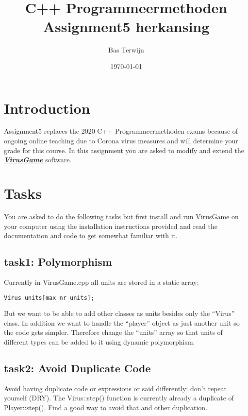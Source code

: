 \documentclass[12pt]{article}
\title{C++ Programmeermethoden Assignment5 herkansing}
\author{Bas Terwijn}
\date{\today}
\newcommand*{\link}[2]{\href{#1}{\color{blue}\textbf{\textit{#2}}}}
\begin{document}
\maketitle

\section{Introduction}
Assignment5 replaces the 2020 C++ Programmeermethoden exams because of
ongoing online teaching due to Corona virus measures and will
determine your grade for this course. In this assignment you are asked
to modify and extend the
\link{https://bitbucket.org/bterwijn/virusgame} { VirusGame }
software.
     
\section{Tasks}
You are asked to do the following tasks but first install and run
VirusGame on your computer using the installation instructions
provided and read the documentation and code to get somewhat
familiar with it.

\subsection{task1: Polymorphism}
Currently in VirusGame.cpp all units are stored in a static array:

\begin{tcolorbox}
\begin{verbatim}
Virus units[max_nr_units];
\end{verbatim}
\end{tcolorbox}

But we want to be able to add other classes as units besides only the
``Virus'' class. In addition we want to handle the ``player'' object as
just another unit so the code gets simpler. Therefore change the
``units'' array so that units of different types can be added to it
using dynamic polymorphism.

\subsection{task2: Avoid Duplicate Code}
Avoid having duplicate code or expressions or said differently: don't
repeat yourself (DRY). The Virus::step() function is currently already
a duplicate of Player::step(). Find a good way to avoid that and other
duplication.
\end{document}
